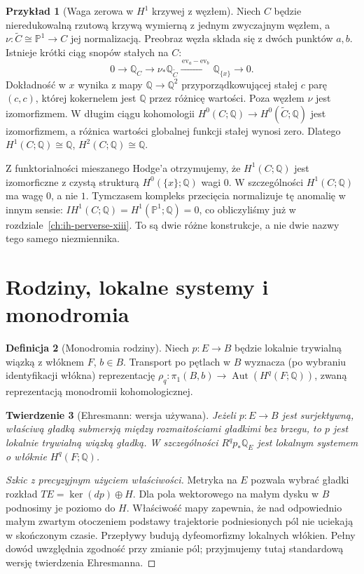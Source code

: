 \documentclass[11pt,a4paper,oneside]{report}
\newcommand{\Q}{\mathbb{Q}}
\theoremstyle{plain}
\newtheorem{twierdzenie}{Twierdzenie}[section]
\theoremstyle{definition}
\newtheorem{definicja}[twierdzenie]{Definicja}
\newtheorem{przyklad}[twierdzenie]{Przykład}
\theoremstyle{remark}
\begin{document}
\begin{przyklad}[Waga zerowa w $H^1$ krzywej z węzłem]
\label{ex:nodal-mhs-xiv}
Niech $C$ będzie nieredukowalną rzutową krzywą
wymierną z jednym zwyczajnym węzłem, a
$\nu:\widetilde C\cong\mathbb P^1\to C$ jej normalizacją.
Preobraz węzła składa się z dwóch punktów $a,b$.
Istnieje krótki ciąg snopów stałych na $C$:
\[
0\to\Q_C\to\nu_*\Q_{\widetilde C}
\xrightarrow{\,\mathrm{ev}_a-\mathrm{ev}_b\,}
\Q_{\{x\}}\to0.
\]
Dokładność w $x$ wynika z mapy $\Q\to\Q^2$
przyporządkowującej stałej $c$ parę $(c,c)$,
której kokernelem jest $\Q$ przez różnicę wartości.
Poza węzłem $\nu$ jest izomorfizmem.
W długim ciągu kohomologii $H^0(C;\Q)\to
H^0(\widetilde C;\Q)$ jest izomorfizmem,
a różnica wartości globalnej funkcji stałej
wynosi zero. Dlatego
$H^1(C;\Q)\cong\Q$,
$H^2(C;\Q)\cong\Q$.

Z funktorialności mieszanego Hodge'a otrzymujemy,
że $H^1(C;\Q)$ jest izomorficzne z czystą
strukturą $H^0(\{x\};\Q)$ wagi $0$.
W szczególności $H^1(C;\Q)$ ma wagę $0$, a nie $1$.
Tymczasem kompleks przecięcia normalizuje tę
anomalię w innym sensie:
$IH^1(C;\Q)=H^1(\mathbb P^1;\Q)=0$,
co obliczyliśmy już w rozdziale~\ref{ch:ih-perverse-xiii}.
To są dwie różne konstrukcje, a nie dwie nazwy
tego samego niezmiennika.
\end{przyklad}

\section{Rodziny, lokalne systemy i monodromia}
\begin{definicja}[Monodromia rodziny]
Niech $p:E\to B$ będzie lokalnie trywialną wiązką
z włóknem $F$, $b\in B$. Transport po pętlach
w $B$ wyznacza (po wybraniu identyfikacji włókna)
reprezentację
$\rho_q:\pi_1(B,b)\to\operatorname{Aut}(H^q(F;\Q))$,
zwaną reprezentacją monodromii kohomologicznej.
\end{definicja}
\begin{twierdzenie}[Ehresmann: wersja używana]
Jeżeli $p:E\to B$ jest surjektywną, właściwą gładką
submersją między rozmaitościami gładkimi bez brzegu,
to $p$ jest lokalnie trywialną wiązką gładką.
W szczególności $R^qp_*\Q_E$ jest lokalnym
systemem o włóknie $H^q(F;\Q)$.
\end{twierdzenie}
\begin{proof}[Szkic z precyzyjnym użyciem właściwości]
Metryka na $E$ pozwala wybrać gładki rozkład
$TE=\ker(dp)\oplus H$. Dla pola wektorowego
na małym dysku w $B$ podnosimy je poziomo do $H$.
Właściwość mapy zapewnia, że nad odpowiednio
małym zwartym otoczeniem podstawy trajektorie
podniesionych pól nie uciekają w skończonym czasie.
Przepływy budują dyfeomorfizmy lokalnych włókien.
Pełny dowód uwzględnia zgodność przy zmianie pól;
przyjmujemy tutaj standardową wersję twierdzenia
Ehresmanna.
\end{proof}
\end{document}
